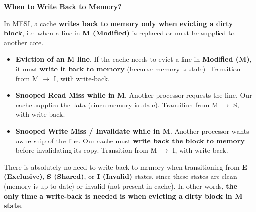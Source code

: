 \begin{flushleft}
    \textcolor{Green3}{ \textbf{When to Write Back to Memory?}}
\end{flushleft}
In MESI, a cache \textbf{writes back to memory only when evicting a dirty block}, i.e. when a line in \textbf{M (Modified)} is replaced or must be supplied to another core.
\begin{itemize}
    \item \textbf{Eviction of an M line}. If the cache needs to evict a line in \textbf{Modified (M)}, it must \textbf{write it back to memory} (because memory is stale). Transition from M $\to$ I, with write-back.
    \item \textbf{Snooped Read Miss while in M}. Another processor requests the line. Our cache supplies the data (since memory is stale). Transition from M $\to$ S, with write-back.
    \item \textbf{Snooped Write Miss / Invalidate while in M}. Another processor wants ownership of the line. Our cache must \textbf{write back the block to memory} before invalidating its copy. Transition from M $\to$ I, with write-back.
\end{itemize}
There is absolutely no need to write back to memory when transitioning from \textbf{E (Exclusive)}, \textbf{S (Shared)}, or \textbf{I (Invalid)} states, since these states are clean (memory is up-to-date) or invalid (not present in cache). In other words, \textbf{the only time a write-back is needed is when evicting a dirty block in M state}.